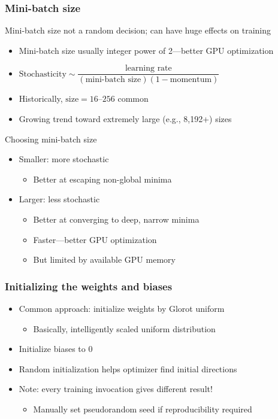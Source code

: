 \begin{frame}
    \frametitle{Mini-batch size}

    Mini-batch size not a random decision; can have huge effects on training
    \begin{itemize}
        \item Mini-batch size usually integer power of 2---better GPU optimization
        \item $\text{Stochasticity} \sim \dfrac{\text{learning rate}}{(\text{mini-batch size}) (1 - \text{momentum})}$ \citep{SmithNIPS17}
        \item Historically, $\text{size} = 16 \text{--} 256$ common
        \item Growing trend toward extremely large (e.g., 8,192+) sizes
    \end{itemize}
    \pause

    Choosing mini-batch size
    \begin{itemize}
        \item Smaller: more stochastic
        \begin{itemize}
            \item Better at escaping non-global minima
        \end{itemize}
        \item Larger: less stochastic
        \begin{itemize}
            \item Better at converging to deep, narrow minima
            \item Faster---better GPU optimization
            \item But limited by available GPU memory
        \end{itemize}
    \end{itemize}
\end{frame}

\begin{frame}
    \frametitle{Initializing the weights and biases}

    \begin{itemize}
        \item Common approach: initialize weights by Glorot uniform \citep{GlorotAISTATS10}
        \begin{itemize}
            \item Basically, intelligently scaled uniform distribution
        \end{itemize}
        \item Initialize biases to 0
        \item Random initialization helps optimizer find initial directions
        \item Note: every training invocation gives different result!
        \begin{itemize}
            \item Manually set pseudorandom seed if reproducibility required
        \end{itemize}
    \end{itemize}
\end{frame}

